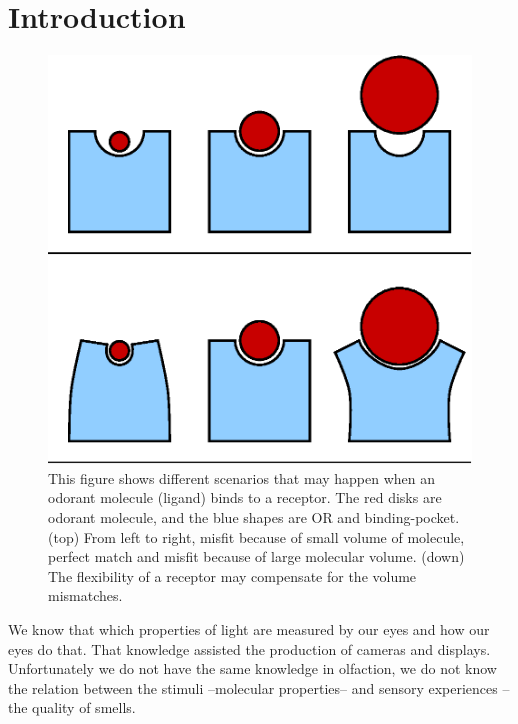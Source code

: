 \documentclass[11pt]{paper} %
\begin{document}
\section*{Introduction}
\begin{figure}
	\centering
	\includegraphics[width=0.4 \textwidth]{binding-pocket-size-flex}
	\caption{This figure shows different scenarios that may happen when an odorant molecule (ligand) binds to a receptor. 
		The red disks  are odorant molecule, 
		and the blue shapes are OR and binding-pocket.	
		(top) From left to right, misfit because of small volume of molecule, 
		perfect match and misfit because of large molecular volume.
		(down) The flexibility of a receptor may compensate for the volume mismatches.
		}
	\label{fig:binding-pocket}
\end{figure}


We know that which properties of light are measured by our eyes and how our eyes do that. 
That knowledge assisted the production of cameras and displays. 
Unfortunately we do not have the same knowledge in olfaction, 
we do not know the relation between the stimuli --molecular properties-- and sensory experiences --the quality of smells.  

\end{document}
